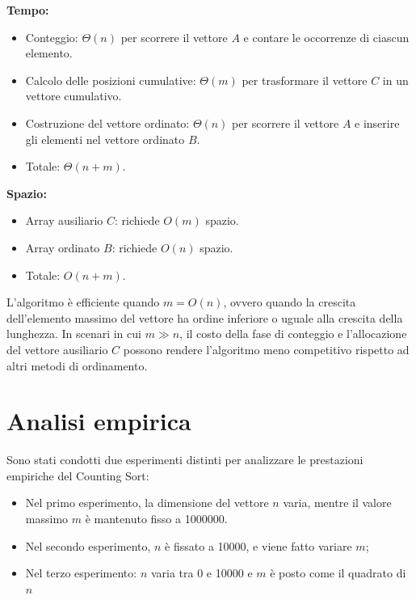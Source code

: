 \documentclass[a4paper, 12pt, oneside]{book}
\begin{document}
\noindent \textbf{Tempo:}

\begin{itemize}
    \item Conteggio: \(\Theta(n)\) per scorrere il vettore \(A\) e contare le occorrenze di ciascun elemento.
    \item Calcolo delle posizioni cumulative: \(\Theta(m)\) per trasformare il vettore \(C\) in un vettore cumulativo.
    \item Costruzione del vettore ordinato: \(\Theta(n)\) per scorrere il vettore \(A\) e inserire gli elementi nel vettore ordinato \(B\).
    \item Totale: \(\Theta(n + m)\).
\end{itemize}

\noindent \textbf{Spazio:}

\begin{itemize}
    \item Array ausiliario \(C\): richiede \(O(m)\) spazio.
    \item Array ordinato \(B\): richiede \(O(n)\) spazio.
    \item Totale: \(O(n + m)\).
\end{itemize}

\noindent L'algoritmo è efficiente quando \(m = O(n)\), ovvero quando la crescita dell'elemento massimo del vettore ha ordine inferiore o uguale alla crescita della lunghezza.
In scenari in cui \(m \gg n\), il costo della fase di conteggio e l'allocazione del vettore ausiliario \(C\) possono rendere l'algoritmo meno competitivo rispetto ad altri metodi di ordinamento.


\section{Analisi empirica}

Sono stati condotti due esperimenti distinti per analizzare le prestazioni empiriche del Counting Sort:

\begin{itemize}
    \item Nel primo esperimento, la dimensione del vettore \(n\) varia, mentre il valore massimo \(m\) è mantenuto fisso a 1000000.
    \item Nel secondo esperimento, \(n\) è fissato a 10000, e viene fatto variare \(m\);
    \item Nel terzo esperimento: \(n\) varia tra 0 e 10000 e \(m\) è posto come il quadrato di \(n\)
\end{itemize}
\end{document}

